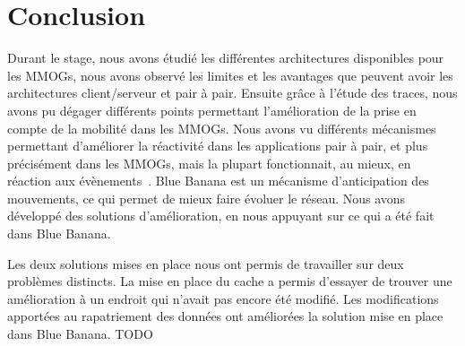 \section{Conclusion}
	Durant le stage, nous avons étudié les différentes architectures disponibles pour les MMOGs, nous avons observé les limites et les avantages que peuvent avoir les architectures client/serveur et pair à pair. Ensuite grâce à l'étude des traces, nous avons pu dégager différents points permettant l'amélioration de la prise en compte de la mobilité dans les MMOGs. Nous avons vu différents mécanismes permettant d'améliorer la réactivité dans les applications pair à pair, et plus précisément dans les MMOGs, mais la plupart fonctionnait, au mieux, en réaction aux évènements~\cite{10.1109/SRDS.2006.33}. Blue Banana est un mécanisme d'anticipation des mouvements, ce qui permet de mieux faire évoluer le réseau. Nous avons développé des solutions d'amélioration, en nous appuyant sur ce qui a été fait dans Blue Banana.\\

	\par Les deux solutions mises en place nous ont permis de travailler sur deux problèmes distincts. La mise en place du cache a permis d'essayer de trouver une amélioration à un endroit qui n'avait pas encore été modifié. Les modifications apportées au rapatriement des données ont améliorées la solution mise en place dans Blue Banana. TODO	

